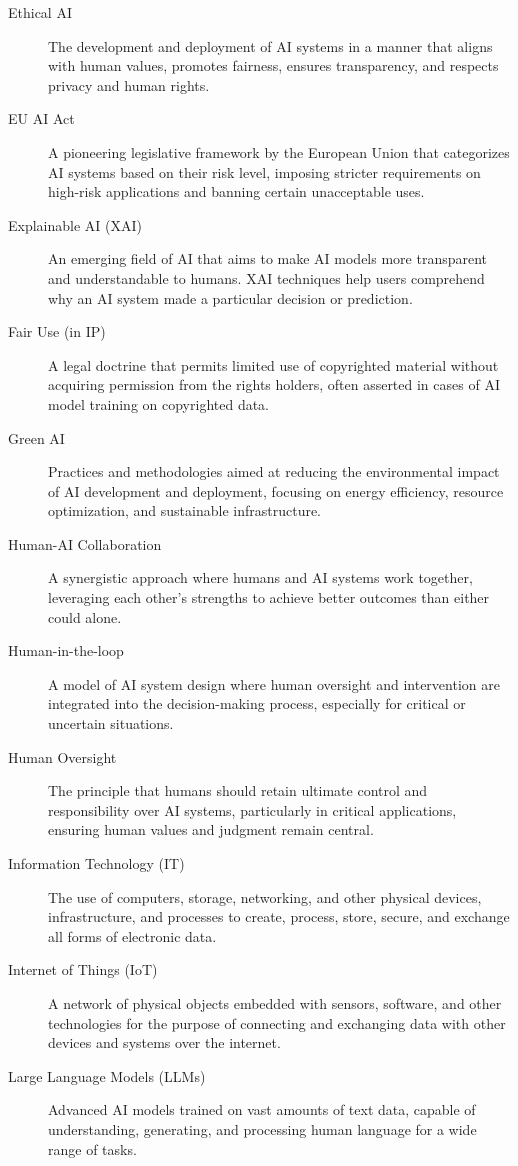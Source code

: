 \begin{description}
    \item[Ethical AI] The development and deployment of AI systems in a manner that aligns with human values, promotes fairness, ensures transparency, and respects privacy and human rights.
    \item[EU AI Act] A pioneering legislative framework by the European Union that categorizes AI systems based on their risk level, imposing stricter requirements on high-risk applications and banning certain unacceptable uses.
    \item[Explainable AI (XAI)] An emerging field of AI that aims to make AI models more transparent and understandable to humans. XAI techniques help users comprehend why an AI system made a particular decision or prediction.
    \item[Fair Use (in IP)] A legal doctrine that permits limited use of copyrighted material without acquiring permission from the rights holders, often asserted in cases of AI model training on copyrighted data.
    \item[Green AI] Practices and methodologies aimed at reducing the environmental impact of AI development and deployment, focusing on energy efficiency, resource optimization, and sustainable infrastructure.
    \item[Human-AI Collaboration] A synergistic approach where humans and AI systems work together, leveraging each other's strengths to achieve better outcomes than either could alone.
    \item[Human-in-the-loop] A model of AI system design where human oversight and intervention are integrated into the decision-making process, especially for critical or uncertain situations.
    \item[Human Oversight] The principle that humans should retain ultimate control and responsibility over AI systems, particularly in critical applications, ensuring human values and judgment remain central.
    \item[Information Technology (IT)] The use of computers, storage, networking, and other physical devices, infrastructure, and processes to create, process, store, secure, and exchange all forms of electronic data.
    \item[Internet of Things (IoT)] A network of physical objects embedded with sensors, software, and other technologies for the purpose of connecting and exchanging data with other devices and systems over the internet.
    \item[Large Language Models (LLMs)] Advanced AI models trained on vast amounts of text data, capable of understanding, generating, and processing human language for a wide range of tasks.

\end{description}
